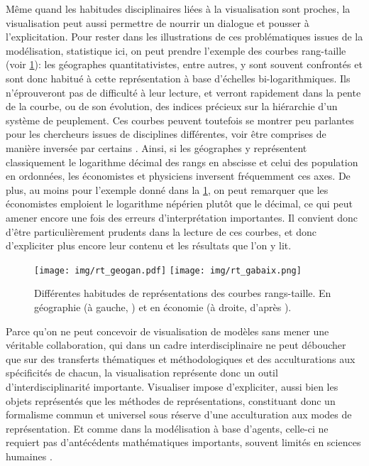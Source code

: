 \documentclass[a4paper, 12pt]{article}
\begin{document}
Même quand les habitudes disciplinaires liées à la visualisation sont proches, la visualisation peut aussi permettre de nourrir un dialogue et pousser à l'explicitation.
Pour rester dans les illustrations de ces problématiques issues de la modélisation, statistique ici, on peut prendre l'exemple des courbes \og rang-taille\fg{} (voir \cref{fig:rt-gibrat}): les géographes quantitativistes, entre autres, y sont souvent confrontés et sont donc habitué à cette représentation à base d'échelles bi-logarithmiques.
Ils n'éprouveront pas de difficulté à leur lecture, et verront rapidement dans la pente de la courbe, ou de son évolution, des indices précieux sur la hiérarchie d'un système de peuplement.
Ces courbes peuvent toutefois se montrer peu parlantes pour les chercheurs issues de disciplines différentes, voir être comprises de manière inversée par certains \autocite[36]{pumain_theorie_2012}.
Ainsi, si les géographes y représentent classiquement le logarithme décimal des rangs en abscisse et celui des population en ordonnées, les économistes et physiciens inversent fréquemment ces axes. De plus, au moins pour l'exemple donné dans la \cref{fig:rt-gibrat}, on peut remarquer que les économistes emploient le logarithme népérien plutôt que le décimal, ce qui peut amener encore une fois des erreurs d'interprétation importantes.
Il convient donc d'être particulièrement prudents dans la lecture de ces courbes, et donc d'expliciter plus encore leur contenu et les résultats que l'on y lit.

\begin{figure}[H]
\texttt{[image: img/rt\_geogan.pdf]}
\texttt{[image: img/rt\_gabaix.png]}
\caption{Différentes habitudes de représentations des courbes rangs-taille.
En géographie (à gauche, \cite[fig.~2, p.~369 ]{cura_old_2017}) et en économie (à droite, d'après \cite[fig.~1, p.~740]{gabaix1999zipf}).}
\label{fig:rt-gibrat}
\end{figure}

\bigskip

Parce qu'on ne peut concevoir de visualisation de modèles sans mener une véritable collaboration, qui dans un cadre interdisciplinaire ne peut déboucher que sur des transferts thématiques et méthodologiques et des acculturations aux spécificités de chacun, la visualisation représente donc un outil d'interdisciplinarité importante.
Visualiser impose d'expliciter, aussi bien les objets représentés que les méthodes de représentations, constituant donc un formalisme commun et universel sous réserve d'une acculturation aux modes de représentation.
Et comme dans la modélisation à base d'agents, celle-ci ne requiert pas d'antécédents mathématiques importants, souvent limités en sciences humaines \autocite{banos_pour_2013}.
\end{document}
